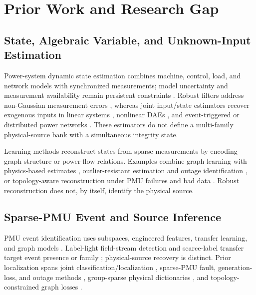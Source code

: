 \section{Prior Work and Research Gap}
\label{sec:related-work}

\subsection{State, Algebraic Variable, and Unknown-Input Estimation}

Power-system dynamic state estimation combines machine, control, load, and network models with synchronized measurements; model uncertainty and measurement availability remain persistent constraints \cite{zhao2019dse}. Robust filters address non-Gaussian measurement errors \cite{zhao2018gmukf,li2023eventtriggered}, whereas joint input/state estimators recover exogenous inputs in linear systems \cite{gillijns2007input}, nonlinear DAEs \cite{nugroho2022dae,katanic2024recursive}, and event-triggered or distributed power networks \cite{qu2023joint,nguyen2021unknown}. These estimators do not define a multi-family physical-source bank with a simultaneous integrity state.

Learning methods reconstruct states from sparse measurements by encoding graph structure or power-flow relations. Examples combine graph learning with physics-based estimates \cite{ngo2024pignn}, outlier-resistant estimation and outage identification \cite{yue2024graph}, or topology-aware reconstruction under PMU failures and bad data \cite{moshtagh2025topology}. Robust reconstruction does not, by itself, identify the physical source.

\subsection{Sparse-PMU Event and Source Inference}

PMU event identification uses subspaces, engineered features, transfer learning, and graph models \cite{li2018subspace,yuan2021learning,li2022transfer,yuan2023gnn}. Label-light field-stream detection and scarce-label transfer target event presence or family \cite{cheng2022bigan,abdelhai2021transfer}; physical-source recovery is distinct. Prior localization spans joint classification/localization \cite{pandey2020realtime}, sparse-PMU fault, generation-loss, and outage methods \cite{li2019cnn,azizi2021log,azizi2023line,yildiz2024few}, group-sparse physical dictionaries \cite{wang2024group}, and topology-constrained graph losses \cite{li2024knowledge}.

